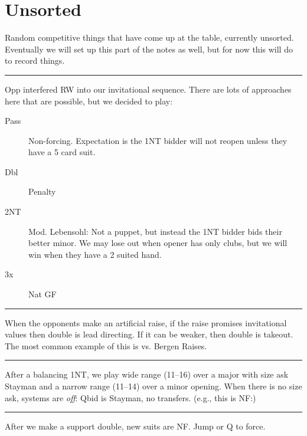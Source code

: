\documentclass[tom-ari]{subfile}
\begin{document}
	
	\chapter{Unsorted}
	
	Random competitive things that have come up at the table, currently unsorted. Eventually we will set up this part of the notes as well, but for now this will do to record things.
	
	\hrule
	
	
	Opp interfered RW into our invitational sequence. There are lots of approaches here that are possible, but we decided to play:
	\begin{description}
		\item[Pass] Non-forcing. Expectation is the 1NT bidder will not reopen unless they have a 5 card suit.
		\item[Dbl] Penalty
		\item[2NT] Mod. Lebensohl: Not a puppet, but instead the 1NT bidder bids their better minor. We may lose out when opener has only clubs, but we will win when they have a 2 suited hand.
		\item[3x] Nat GF
	\end{description}

	\hrule
	
	When the opponents make an artificial raise, if the raise promises invitational values then double is lead directing. If it can be weaker, then double is takeout. The most common example of this is vs. Bergen Raises.
	
	\hrule
	
	After a balancing 1NT, we play wide range (11--16) over a major with size ask Stayman and a narrow range (11--14) over a minor opening. When there is no size ask, systems are \textit{off}: Qbid is Stayman, no transfers. (e.g., this is NF:) 

	\hrule
	
	After we make a support double, new suits are NF. Jump or Q to force.
\end{document}
